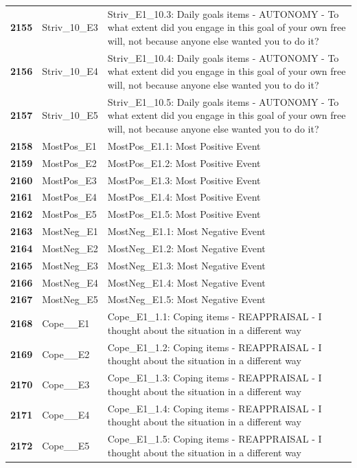 \documentclass[
  letterpaper,
  DIV=11,
  numbers=noendperiod]{scrartcl}
\begin{document}
\begin{longtable}[t]{>{}cll}
\textbf{2155} & Striv\_10\_E3 & Striv\_E1\_10.3: Daily goals items - AUTONOMY - To what extent did you engage in this goal of your own free will, not because anyone else wanted you to do it?\\
\addlinespace
\textbf{2156} & Striv\_10\_E4 & Striv\_E1\_10.4: Daily goals items - AUTONOMY - To what extent did you engage in this goal of your own free will, not because anyone else wanted you to do it?\\
\textbf{2157} & Striv\_10\_E5 & Striv\_E1\_10.5: Daily goals items - AUTONOMY - To what extent did you engage in this goal of your own free will, not because anyone else wanted you to do it?\\
\textbf{2158} & MostPos\_E1 & MostPos\_E1.1: Most Positive Event\\
\textbf{2159} & MostPos\_E2 & MostPos\_E1.2: Most Positive Event\\
\textbf{2160} & MostPos\_E3 & MostPos\_E1.3: Most Positive Event\\
\addlinespace
\textbf{2161} & MostPos\_E4 & MostPos\_E1.4: Most Positive Event\\
\textbf{2162} & MostPos\_E5 & MostPos\_E1.5: Most Positive Event\\
\textbf{2163} & MostNeg\_E1 & MostNeg\_E1.1: Most Negative Event\\
\textbf{2164} & MostNeg\_E2 & MostNeg\_E1.2: Most Negative Event\\
\textbf{2165} & MostNeg\_E3 & MostNeg\_E1.3: Most Negative Event\\
\addlinespace
\textbf{2166} & MostNeg\_E4 & MostNeg\_E1.4: Most Negative Event\\
\textbf{2167} & MostNeg\_E5 & MostNeg\_E1.5: Most Negative Event\\
\textbf{2168} & Cope\_\_E1 & Cope\_E1\_1.1: Coping items - REAPPRAISAL - I thought about the situation in a different way\\
\textbf{2169} & Cope\_\_E2 & Cope\_E1\_1.2: Coping items - REAPPRAISAL - I thought about the situation in a different way\\
\textbf{2170} & Cope\_\_E3 & Cope\_E1\_1.3: Coping items - REAPPRAISAL - I thought about the situation in a different way\\
\addlinespace
\textbf{2171} & Cope\_\_E4 & Cope\_E1\_1.4: Coping items - REAPPRAISAL - I thought about the situation in a different way\\
\textbf{2172} & Cope\_\_E5 & Cope\_E1\_1.5: Coping items - REAPPRAISAL - I thought about the situation in a different way\\

\end{longtable}
\end{document}
